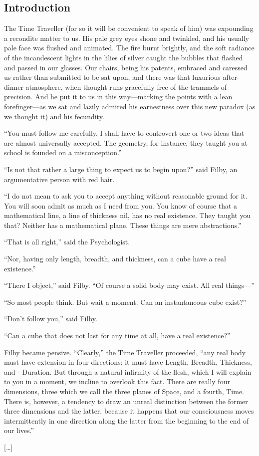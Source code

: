 \documentclass[../book]{subfiles}
\begin{document}
\begin{markdown}


\chapter*{Introduction}


The Time Traveller (for so it will be convenient to speak of him) was expounding a recondite matter to us. His pale grey eyes shone and twinkled, and his usually pale face was flushed and animated. The fire burnt brightly, and the soft radiance of the incandescent lights in the lilies of silver caught the bubbles that flashed and passed in our glasses. Our chairs, being his patents, embraced and caressed us rather than submitted to be sat upon, and there was that luxurious after-dinner atmosphere, when thought runs gracefully free of the trammels of precision. And he put it to us in this way—marking the points with a lean forefinger—as we sat and lazily admired his earnestness over this new paradox (as we thought it) and his fecundity.

“You must follow me carefully. I shall have to controvert one or two ideas that are almost universally accepted. The geometry, for instance, they taught you at school is founded on a misconception.”

“Is not that rather a large thing to expect us to begin upon?” said Filby, an argumentative person with red hair.

“I do not mean to ask you to accept anything without reasonable ground for it. You will soon admit as much as I need from you. You know of course that a mathematical line, a line of thickness nil, has no real existence. They taught you that? Neither has a mathematical plane. These things are mere abstractions.”

“That is all right,” said the Psychologist.

“Nor, having only length, breadth, and thickness, can a cube have a real existence.”

“There I object,” said Filby. “Of course a solid body may exist. All real things—”

“So most people think. But wait a moment. Can an instantaneous cube exist?”

“Don’t follow you,” said Filby.

“Can a cube that does not last for any time at all, have a real existence?”

Filby became pensive. “Clearly,” the Time Traveller proceeded, “any real body must have extension in four directions: it must have Length, Breadth, Thickness, and—Duration. But through a natural infirmity of the flesh, which I will explain to you in a moment, we incline to overlook this fact. There are really four dimensions, three which we call the three planes of Space, and a fourth, Time. There is, however, a tendency to draw an unreal distinction between the former three dimensions and the latter, because it happens that our consciousness moves intermittently in one direction along the latter from the beginning to the end of our lives.”

[…]


\end{markdown}
\end{document}
